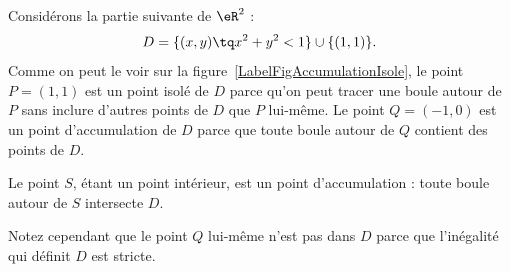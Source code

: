 \newcommand{\CaptionFigAccumulationIsole}{L'ensemble décrit par l'équation \eqref{Eq2807BouleIso}. Le point $P$ est un point isolé de $D$, tandis que  les points $S$ et $Q$ sont des points d'accumulation.}


\begin{example}
	Considérons la partie suivante de $\eR^2$ :
	\begin{equation}	\label{Eq2807BouleIso}
		D=\{ (x,y)\tq x^2+y^2<1\}\cup\{ (1,1) \}.
	\end{equation}
	Comme on peut le voir sur la figure~\ref{LabelFigAccumulationIsole}, le point $P=(1,1)$ est un point isolé de $D$ parce qu'on peut tracer une boule autour de $P$ sans inclure d'autres points de $D$ que $P$ lui-même. Le point $Q=(-1,0)$ est un point d'accumulation de $D$ parce que toute boule autour de $Q$ contient des points de $D$.

    Le point $S$, étant un point intérieur, est un point d'accumulation : toute boule autour de $S$ intersecte $D$.

    Notez cependant que le point $Q$ lui-même n'est pas dans $D$ parce que l'inégalité qui définit $D$ est stricte.
\end{example}

